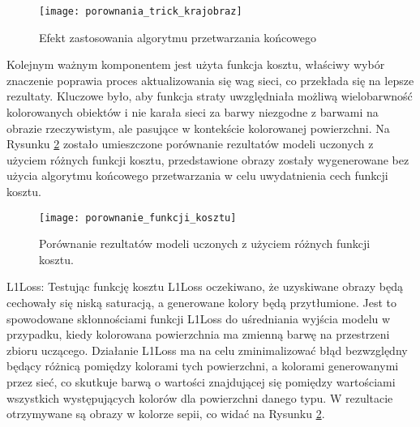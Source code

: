   \begin{figure}[H]
   \centering
   \texttt{[image: porownania\_trick\_krajobraz]}
   \caption[Efekt zastosowania algorytmu przetwarzania końcowego - źródło
   rysunek własny na podstawie: \url{https://pl.wikipedia.org/wiki/Plik:PL_Bagno_Calowanie_2.jpg}]
   {Efekt zastosowania algorytmu przetwarzania końcowego}
   \label{fig:trick}
  \end{figure}

  Kolejnym ważnym komponentem jest użyta funkcja kosztu, właściwy wybór
  znaczenie poprawia proces aktualizowania się wag sieci, co przekłada się
  na lepsze rezultaty. Kluczowe było, aby funkcja straty uwzględniała
  możliwą wielobarwność kolorowanych obiektów i nie karała sieci za barwy niezgodne
  z barwami na obrazie rzeczywistym, ale pasujące w kontekście kolorowanej
  powierzchni. Na Rysunku \ref{fig:porownanie_funkcji_kosztu} zostało
  umieszczone porównanie rezultatów modeli uczonych z użyciem różnych funkcji
  kosztu, przedstawione obrazy zostały wygenerowane bez użycia algorytmu
  końcowego przetwarzania w celu uwydatnienia cech funkcji kosztu.

  \begin{figure}[H]
   \centering
   \texttt{[image: porownanie\_funkcji\_kosztu]}
   \caption[Porównanie rezultatów modeli uczonych z użyciem różnych funkcji
   kosztu - źródło rysunek własny na podstawie: \url{https://cdn.thearthunters.com/wp-content/uploads/2013/06/bg-960x636.jpg}]
   {Porównanie rezultatów modeli uczonych z użyciem różnych funkcji
   kosztu.}
   \label{fig:porownanie_funkcji_kosztu}
  \end{figure}

  \noindent
  L1Loss: Testując funkcję kosztu L1Loss oczekiwano, że uzyskiwane obrazy będą
  cechowały się niską saturacją, a generowane kolory będą przytłumione. Jest
  to spowodowane skłonnościami funkcji L1Loss do uśredniania wyjścia modelu w
  przypadku, kiedy kolorowana powierzchnia ma zmienną barwę na przestrzeni
  zbioru uczącego. Działanie L1Loss ma na celu zminimalizować błąd bezwzględny
  będący różnicą pomiędzy kolorami tych powierzchni, a kolorami generowanymi
  przez sieć, co skutkuje barwą o wartości znajdującej się pomiędzy wartościami
  wszystkich występujących kolorów dla powierzchni danego typu. W rezultacie
  otrzymywane są obrazy w kolorze sepii, co widać na Rysunku
  \ref{fig:porownanie_funkcji_kosztu}.

